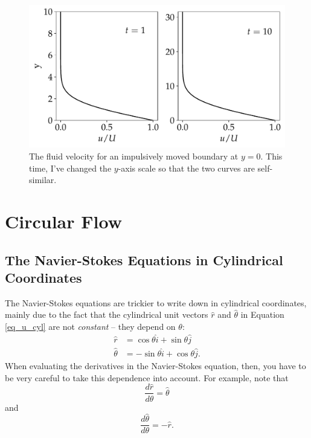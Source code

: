 \begin{figure}
\centering
\includegraphics[width=0.8\linewidth]{Figures/Chapter2/fig_ss_vel2}
\caption{The fluid velocity for an impulsively moved boundary at $y=0$.  This time, I've changed the $y$-axis scale so that the two curves are self-similar.}
\label{fig_ss_vel2}
\end{figure}


%
% 

\section{Circular Flow}



\subsection{The Navier-Stokes Equations in Cylindrical Coordinates}
\label{sec_ns_cyl}

The Navier-Stokes equations are trickier to write down in cylindrical coordinates, mainly due to the fact that the cylindrical unit vectors $\hat{r}$ and $\hat{\theta}$ in Equation \ref{eq_u_cyl} are not \emph{constant} -- they depend on $\theta$:
\begin{align*}
\hat{r} & = \cos \theta \hat{i} + \sin \theta \hat{j} \\
\hat{\theta} & = - \sin \theta \hat{i} + \cos \theta \hat{j}.
\end{align*}
When evaluating the derivatives in the Navier-Stokes equation, then, you have to be very careful to take this dependence into account.  For example, note that
\[
\frac{d\hat{r}}{d\theta} = \hat{\theta}
\]
and
\[
\frac{d\hat{\theta}}{d\theta} = - \hat{r}.
\]

